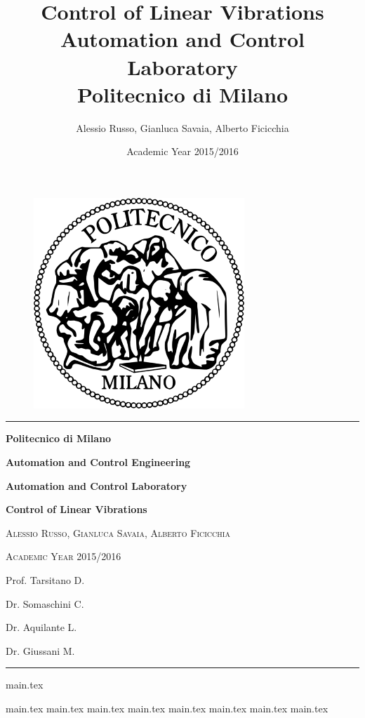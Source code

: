 \documentclass[10pt,a4paper,titlepage]{report}
\author{Alessio Russo, Gianluca Savaia, Alberto Ficicchia}
\title{Control of Linear Vibrations \\
\Large Automation and Control Laboratory \\
 Politecnico di Milano}
\date{Academic Year 2015/2016}
\begin{document}
\begin{titlepage}

\centering		
\vspace{3cm}
\begin{figure}[!h]
\centering
  \includegraphics[scale=0.7]{img/logo.png} 
\end{figure}
\rule{\textwidth}{1pt}
 \par 
\vspace{2cm}
{\Large\bfseries Politecnico di Milano \par}
{\Large\bfseries Automation and Control Engineering\par}
\vspace{2cm}
{\Large\bfseries Automation and Control Laboratory\par}
{\huge\bfseries Control of Linear Vibrations\par}
\vspace{0.3cm}
{\large\scshape Alessio Russo, Gianluca Savaia, Alberto Ficicchia\par}
\vspace{0.3cm}
{\scshape Academic Year 2015/2016\par}
\vspace{3.5cm}
\hspace{12cm}
{ Prof. Tarsitano D.\par}
\hspace{11cm}
{ Dr. Somaschini C.\par}
\hspace{11.5cm}
{ Dr. Aquilante L.\par}
\hspace{11.1cm}
{ Dr. Giussani M.\par}
\rule{\textwidth}{1pt}
\end{titlepage}
\tableofcontents


{main.tex}

\newpage
{main.tex}
\newpage
{main.tex}
	{main.tex}
{main.tex}
{main.tex}
\newpage
{main.tex}
\newpage
{main.tex}
{main.tex}

\printbibliography
\end{document}
